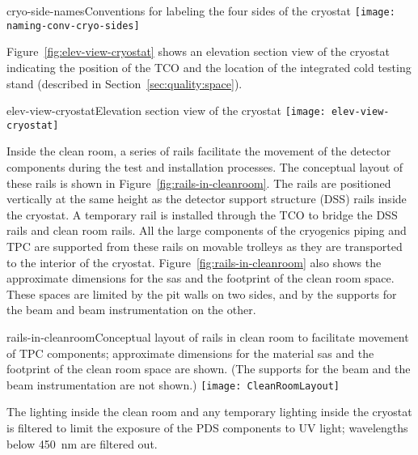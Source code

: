 \begin{cdrfigure}{cryo-side-names}{Conventions for labeling the four sides of the cryostat}
\texttt{[image: naming-conv-cryo-sides]}
\end{cdrfigure}

Figure~\ref{fig:elev-view-cryostat} shows an elevation section view of the cryostat indicating the position of the TCO and the location of the integrated cold testing stand (described in Section~\ref{sec:quality:space}).  

\begin{cdrfigure}{elev-view-cryostat}{Elevation section view of the cryostat}
\texttt{[image: elev-view-cryostat]}
\end{cdrfigure}

Inside the clean room, a series of rails facilitate the movement of the detector components during the test and installation processes.  The conceptual layout of these rails is shown in Figure~\ref{fig:rails-in-cleanroom}.  The rails are positioned vertically at the same height as the detector support structure (DSS) rails inside the cryostat.  A temporary rail is installed through the TCO to bridge the DSS rails and clean room rails.  All the large components of the cryogenics piping and TPC are supported from these rails on movable trolleys as they are transported to the interior of the cryostat.  
Figure~\ref{fig:rails-in-cleanroom} also shows the approximate dimensions for the sas and the footprint of the clean room space.  These spaces are limited by the pit walls on two sides, and by the supports for the beam and beam instrumentation on the other. 


\begin{cdrfigure}{rails-in-cleanroom}{Conceptual layout of rails in clean room to facilitate movement of TPC components; approximate dimensions for the material sas and the footprint of the clean room space are shown. (The supports for the beam and the beam instrumentation are not shown.)}
\texttt{[image: CleanRoomLayout]}
\end{cdrfigure}

The lighting inside the clean room and any temporary lighting inside the cryostat is filtered to limit the exposure of the PDS components to UV light; wavelengths below 450~nm are filtered out. 


